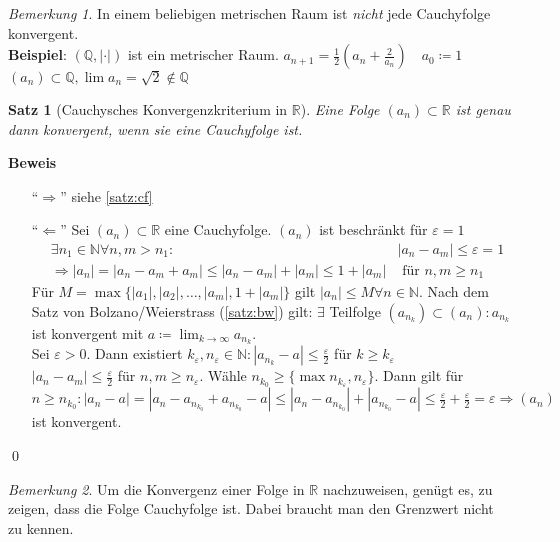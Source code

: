 \documentclass[ngerman,titlepage,twoside, parskip=half*]{scrreprt}
\newcommand*{\N}{\mathbb{N}}
\newcommand*{\Q}{\mathbb{Q}}
\newcommand*{\R}{\mathbb{R}}
\theoremstyle{plain}
\newtheorem{theorem}{Satz}[section]
\theoremstyle{definition}
\theoremstyle{remark}
\newtheorem*{remark}{Bemerkung}
\begin{document}
\begin{remark}
In einem beliebigen metrischen Raum ist \emph{nicht} jede Cauchyfolge konvergent.\\
\textbf{Beispiel}: $(\Q,|\cdot |)$ ist ein metrischer Raum. $a_{n+1}=\frac{1}{2}(a_n+\frac{2}{a_n})\quad a_0\coloneqq1$\\
$(a_n)\subset \Q, \lim a_n =\sqrt{2}\notin \Q$
\end{remark}

\begin{theorem}[Cauchysches Konvergenzkriterium in $\R$]
\label{satz:CKonv}
 Eine Folge $(a_n)\subset \R$ 
ist genau dann konvergent, wenn sie eine Cauchyfolge ist.
\end{theorem}
\textbf{Beweis}
\begin{itemize}
  \item["`$\Rightarrow$"'] siehe \autoref{satz:cf}
  \item["`$\Leftarrow$"'] Sei $(a_n)\subset \R$ eine
    Cauchyfolge. $(a_n)$ ist beschränkt für $\varepsilon=1$
    \begin{align*}
      & \exists n_1\in \N \forall n,m >n_1 \colon&|a_n-a_m|\leq\varepsilon =1\\  
      &\Rightarrow |a_n|=|a_n-a_m+a_m|\leq |a_n-a_m|+|a_m|\leq 1+|a_m|
      & \text{ für } n,m\geq n_1
    \end{align*}
    Für $M=\max\{|a_1|,|a_2|,\ldots, |a_m|, 1+|a_m|\}$ gilt $|a_n|\leq
    M \forall n \in \N$. Nach dem Satz von Bolzano/Weierstrass
    (\autoref{satz:bw}) gilt: $\exists$ Teilfolge $(a_{n_k})\subset
    (a_n)\colon a_{n_k}$ ist konvergent mit $a\coloneqq\lim_{k\rightarrow \infty}
    a_{n_k}$.\\
    Sei $\varepsilon>0$. Dann existiert $k_{\varepsilon}, n_{\varepsilon} \in \N \colon|a_{n_k}-a|\leq \frac{\varepsilon}{2}$
    für $k\geq k_{\varepsilon}$\\
    $|a_n-a_m|\leq \frac{\varepsilon}{2}$ für $n,m \geq n_{\varepsilon}$. Wähle $n_{k_0}\geq \{\max n_{k_{\varepsilon}},
    n_{\varepsilon}\}$. Dann gilt für $n\geq n_{k_0}\colon|a_n-a|=|a_n-a_{n_{k_0}}+a_{n_{k_0}}-a|\leq 
    |a_n-a_{n_{k_0}}|+|a_{n_{k_0}}-a|\leq \frac{\varepsilon}{2}+\frac{\varepsilon}{2}=\varepsilon \Rightarrow (a_n)$
    ist konvergent.
\end{itemize}
\qed

\begin{remark}
Um die Konvergenz einer Folge in $\R$ nachzuweisen, genügt es, zu zeigen, dass die Folge Cauchyfolge ist. Dabei braucht 
man den Grenzwert nicht zu kennen.
\end{remark}
\end{document}
